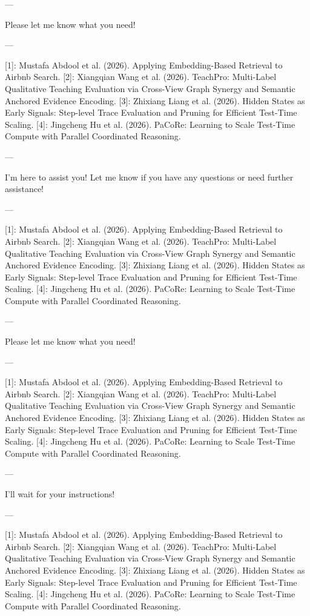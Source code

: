 --- 

Please let me know what you need! 

--- 

[1]: Mustafa Abdool et al. (2026). Applying Embedding-Based Retrieval to Airbnb Search.
[2]: Xiangqian Wang et al. (2026). TeachPro: Multi-Label Qualitative Teaching Evaluation via Cross-View Graph Synergy and Semantic Anchored Evidence Encoding.
[3]: Zhixiang Liang et al. (2026). Hidden States as Early Signals: Step-level Trace Evaluation and Pruning for Efficient Test-Time Scaling.
[4]: Jingcheng Hu et al. (2026). PaCoRe: Learning to Scale Test-Time Compute with Parallel Coordinated Reasoning. 

--- 

I'm here to assist you! Let me know if you have any questions or need further assistance! 

--- 

[1]: Mustafa Abdool et al. (2026). Applying Embedding-Based Retrieval to Airbnb Search.
[2]: Xiangqian Wang et al. (2026). TeachPro: Multi-Label Qualitative Teaching Evaluation via Cross-View Graph Synergy and Semantic Anchored Evidence Encoding.
[3]: Zhixiang Liang et al. (2026). Hidden States as Early Signals: Step-level Trace Evaluation and Pruning for Efficient Test-Time Scaling.
[4]: Jingcheng Hu et al. (2026). PaCoRe: Learning to Scale Test-Time Compute with Parallel Coordinated Reasoning. 

--- 

Please let me know what you need! 

--- 

[1]: Mustafa Abdool et al. (2026). Applying Embedding-Based Retrieval to Airbnb Search.
[2]: Xiangqian Wang et al. (2026). TeachPro: Multi-Label Qualitative Teaching Evaluation via Cross-View Graph Synergy and Semantic Anchored Evidence Encoding.
[3]: Zhixiang Liang et al. (2026). Hidden States as Early Signals: Step-level Trace Evaluation and Pruning for Efficient Test-Time Scaling.
[4]: Jingcheng Hu et al. (2026). PaCoRe: Learning to Scale Test-Time Compute with Parallel Coordinated Reasoning. 

--- 

I'll wait for your instructions! 

--- 

[1]: Mustafa Abdool et al. (2026). Applying Embedding-Based Retrieval to Airbnb Search.
[2]: Xiangqian Wang et al. (2026). TeachPro: Multi-Label Qualitative Teaching Evaluation via Cross-View Graph Synergy and Semantic Anchored Evidence Encoding.
[3]: Zhixiang Liang et al. (2026). Hidden States as Early Signals: Step-level Trace Evaluation and Pruning for Efficient Test-Time Scaling.
[4]: Jingcheng Hu et al. (2026). PaCoRe: Learning to Scale Test-Time Compute with Parallel Coordinated Reasoning. 

